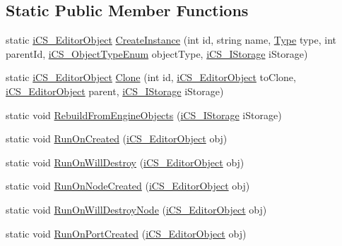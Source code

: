 \subsection*{Static Public Member Functions}
\begin{DoxyCompactItemize}
\item 
static \hyperlink{classi_c_s___editor_object}{i\+C\+S\+\_\+\+Editor\+Object} \hyperlink{classi_c_s___editor_object_a9a7fbc5f76f75a356cbf15e059906cd3}{Create\+Instance} (int id, string name, \hyperlink{i_c_s___object_type_enum_8cs_ae6c3dd6d8597380b56d94908eb431547aa1fa27779242b4902f7ae3bdd5c6d508}{Type} type, int parent\+Id, \hyperlink{i_c_s___object_type_enum_8cs_ae6c3dd6d8597380b56d94908eb431547}{i\+C\+S\+\_\+\+Object\+Type\+Enum} object\+Type, \hyperlink{classi_c_s___i_storage}{i\+C\+S\+\_\+\+I\+Storage} i\+Storage)
\item 
static \hyperlink{classi_c_s___editor_object}{i\+C\+S\+\_\+\+Editor\+Object} \hyperlink{classi_c_s___editor_object_a980274d7570869da8b47f1251883f901}{Clone} (int id, \hyperlink{classi_c_s___editor_object}{i\+C\+S\+\_\+\+Editor\+Object} to\+Clone, \hyperlink{classi_c_s___editor_object}{i\+C\+S\+\_\+\+Editor\+Object} parent, \hyperlink{classi_c_s___i_storage}{i\+C\+S\+\_\+\+I\+Storage} i\+Storage)
\item 
static void \hyperlink{classi_c_s___editor_object_a2a200174b785a0874dc1df449af2177e}{Rebuild\+From\+Engine\+Objects} (\hyperlink{classi_c_s___i_storage}{i\+C\+S\+\_\+\+I\+Storage} i\+Storage)
\item 
static void \hyperlink{classi_c_s___editor_object_ade0d82c64f720d2f1d74134c8c1bc25b}{Run\+On\+Created} (\hyperlink{classi_c_s___editor_object}{i\+C\+S\+\_\+\+Editor\+Object} obj)
\item 
static void \hyperlink{classi_c_s___editor_object_a8b023a66b4ff52adba9dab7001cf5b4e}{Run\+On\+Will\+Destroy} (\hyperlink{classi_c_s___editor_object}{i\+C\+S\+\_\+\+Editor\+Object} obj)
\item 
static void \hyperlink{classi_c_s___editor_object_a83ede99e2bb78468f6a18f94baf7918f}{Run\+On\+Node\+Created} (\hyperlink{classi_c_s___editor_object}{i\+C\+S\+\_\+\+Editor\+Object} obj)
\item 
static void \hyperlink{classi_c_s___editor_object_af6194ebc0933b2a7666720afb3f437cf}{Run\+On\+Will\+Destroy\+Node} (\hyperlink{classi_c_s___editor_object}{i\+C\+S\+\_\+\+Editor\+Object} obj)
\item 
static void \hyperlink{classi_c_s___editor_object_a245d8d340429d2232eaadf397cabd504}{Run\+On\+Port\+Created} (\hyperlink{classi_c_s___editor_object}{i\+C\+S\+\_\+\+Editor\+Object} obj)

\end{DoxyCompactItemize}
